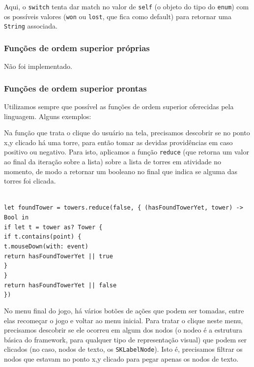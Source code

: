 \documentclass[rel_mlp]{iiufrgs}
\newcommand\tab[1][1cm]{\hspace*{#1}}
\begin{document}
Aqui, o \texttt{switch} tenta dar match no valor de \texttt{self} (o objeto do tipo do \texttt{enum}) com os possíveis valores (\texttt{won} ou \texttt{lost}, que fica como default) para retornar uma \texttt{String} associada.


\subsubsection{Funções de ordem superior próprias}

Não foi implementado.


\subsubsection{Funções de ordem superior prontas}

Utilizamos sempre que possível as funções de ordem superior oferecidas pela linguagem. Alguns exemplos:

Na função que trata o clique do usuário na tela, precisamos descobrir se no ponto x,y clicado há uma torre, para então tomar as devidas providências em caso positivo ou negativo.
Para isto, aplicamos a função \texttt{reduce} (que retorna um valor ao final da iteração sobre a lista) sobre a lista de torres em atividade no momento, de modo a retornar um booleano no final que indica se alguma das torres foi clicada.

\texttt{
\\let foundTower = towers.reduce(false, \{ (hasFoundTowerYet, tower) \tab\tab\tab\tab\tab\tab\tab\tab\tab\tab\tab\tab\tab-> Bool in
    \\\tab if let t = tower as? Tower \{
    \\\tab\tab if t.contains(point) \{
    \\\tab\tab\tab t.mouseDown(with: event)
    \\\tab\tab\tab return hasFoundTowerYet || true
    \\\tab\tab \}
    \\\tab \}
    \\\tab return hasFoundTowerYet || false
\\\})}

No menu final do jogo, há vários botões de ações que podem ser tomadas, entre elas recomeçar o jogo e voltar ao menu inicial.
Para tratar o clique neste menu, precisamos descobrir se ele ocorreu em algum dos nodos (o nodeo é a estrutura básica do framework, para qualquer tipo de representação visual) que podem ser clicados (no caso, nodos de texto, os \texttt{SKLabelNode}). Isto é, precisamos filtrar os nodos que estavam no ponto x,y clicado para pegar apenas os nodos de texto.
\end{document}
